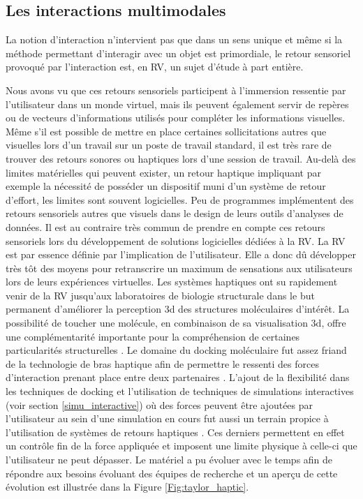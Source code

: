 \subsection{Les interactions multimodales}

La notion d'interaction n'intervient pas que dans un sens unique et même si la méthode permettant d'interagir avec un objet est primordiale, le retour sensoriel provoqué par l'interaction est, en RV, un sujet d'étude à part entière. 

Nous avons vu que ces retours sensoriels participent à l'immersion ressentie par l'utilisateur dans un monde virtuel, mais ils peuvent également servir de repères ou de vecteurs d'informations utilisés pour compléter les informations visuelles. Même s'il est possible de mettre en place certaines sollicitations autres que visuelles lors d'un travail sur un poste de travail standard, il est très rare de trouver des retours sonores ou haptiques lors d'une session de travail. Au-delà des limites matérielles qui peuvent exister, un retour haptique impliquant par exemple la nécessité de posséder un dispositif muni d'un système de retour d'effort, les limites sont souvent logicielles. Peu de programmes implémentent des retours sensoriels autres que visuels dans le design de leurs outils d'analyses de données. Il est au contraire très commun de prendre en compte ces retours sensoriels lors du développement de solutions logicielles dédiées à la RV. La RV est par essence définie par l'implication de l'utilisateur. Elle a donc dû développer très tôt des moyens pour retranscrire un maximum de sensations aux utilisateurs lors de leurs expériences virtuelles. Les systèmes haptiques ont su rapidement venir de la RV jusqu'aux laboratoires de biologie structurale dans le but permanent d'améliorer la perception 3d des structures moléculaires d'intérêt. La possibilité de toucher une molécule, en combinaison de sa visualisation 3d, offre une complémentarité importante pour la compréhension de certaines particularités structurelles \cite{stocks2009interacting}. 
Le domaine du docking moléculaire fut assez friand de la technologie de bras haptique afin de permettre le ressenti des forces d'interaction prenant place entre deux partenaires \cite{nagata2002concept, sankaranarayanan2003role}. L'ajout de la flexibilité dans les techniques de docking et l'utilisation de techniques de simulations interactives (voir section \ref{simu_interactive}) où des forces peuvent être ajoutées par l'utilisateur au sein d'une simulation en cours fut aussi un terrain propice à l'utilisation de systèmes de retours haptiques \cite{stone2001system}. Ces derniers permettent en effet un contrôle fin de la force appliquée et imposent une limite physique à celle-ci que l'utilisateur ne peut dépasser. Le matériel a pu évoluer avec le temps afin de répondre aux besoins évoluant des équipes de recherche et un aperçu de cette évolution est illustrée dans la Figure \ref{Fig:taylor_haptic}.


